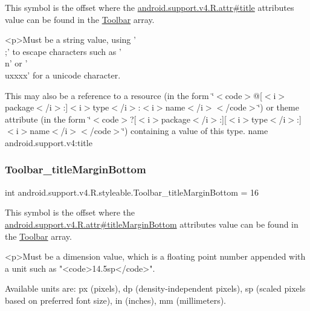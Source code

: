 This symbol is the offset where the \hyperlink{classandroid_1_1support_1_1v4_1_1R_1_1attr_aaa11a7e1e11d0e32f6bae3e8951a2fb8}{android.\+support.\+v4.\+R.\+attr\#title} attribute\textquotesingle{}s value can be found in the \hyperlink{classandroid_1_1support_1_1v4_1_1R_1_1styleable_a211358a2f951023c7735caea0fb5ae04}{Toolbar} array.

\begin{DoxyVerb}      <p>Must be a string value, using '\\;' to escape characters such as '\\n' or '\\uxxxx' for a unicode character.
\end{DoxyVerb}
 

This may also be a reference to a resource (in the form \char`\"{}$<$code$>$@\mbox{[}$<$i$>$package$<$/i$>$\+:\mbox{]}$<$i$>$type$<$/i$>$\+:$<$i$>$name$<$/i$>$$<$/code$>$\char`\"{}) or theme attribute (in the form \char`\"{}$<$code$>$?\mbox{[}$<$i$>$package$<$/i$>$\+:\mbox{]}\mbox{[}$<$i$>$type$<$/i$>$\+:\mbox{]}$<$i$>$name$<$/i$>$$<$/code$>$\char`\"{}) containing a value of this type.  name android.\+support.\+v4\+:title \mbox{\label{classandroid_1_1support_1_1v4_1_1R_1_1styleable_af61d7365bb54301d95ac8b1dbb70d637}} 
\subsubsection{\texorpdfstring{Toolbar\+\_\+title\+Margin\+Bottom}{Toolbar\_titleMarginBottom}}
{\footnotesize\ttfamily int android.\+support.\+v4.\+R.\+styleable.\+Toolbar\+\_\+title\+Margin\+Bottom = 16\hspace{0.3cm}{\ttfamily [static]}}

This symbol is the offset where the \hyperlink{classandroid_1_1support_1_1v4_1_1R_1_1attr_a208e8872b98d2610ddc09d40cd6b4390}{android.\+support.\+v4.\+R.\+attr\#title\+Margin\+Bottom} attribute\textquotesingle{}s value can be found in the \hyperlink{classandroid_1_1support_1_1v4_1_1R_1_1styleable_a211358a2f951023c7735caea0fb5ae04}{Toolbar} array.

\begin{DoxyVerb}      <p>Must be a dimension value, which is a floating point number appended with a unit such as "<code>14.5sp</code>".
\end{DoxyVerb}
 Available units are\+: px (pixels), dp (density-\/independent pixels), sp (scaled pixels based on preferred font size), in (inches), mm (millimeters). 

